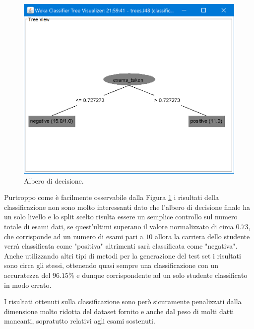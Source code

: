 \documentclass[]{article}
\begin{document}
\begin{center}
\end{center}

\begin{figure}[t]
	\centering
	\includegraphics[scale=0.6]{Img/decision_tree.png}
	\caption{Albero di decisione.
		\label{fig:13}}
\end{figure} 

Purtroppo come \`{e} facilmente osservabile dalla Figura \ref{fig:13} i risultati della classificazione non sono molto interessanti dato che l'albero di decisione finale ha un solo livello e lo split scelto risulta essere un semplice controllo sul numero totale di esami dati, se quest'ultimi superano il valore normalizzato di circa $0.73$, che corrisponde ad un numero di esami pari a $10$ allora la carriera dello studente verr\`{a} classificata come "positiva" altrimenti sar\`{a} classificata come "negativa". Anche utilizzando altri tipi di metodi per la generazione del test set i risultati sono circa gli stessi, ottenendo quasi sempre una classificazione con un accuratezza del $96.15\%$ e dunque corrispondente ad un solo studente classificato in modo errato. 

I risultati ottenuti sulla classificazione sono per\`{o} sicuramente penalizzati dalla dimensione molto ridotta del dataset fornito e anche dal peso di molti datti mancanti, sopratutto relativi agli esami sostenuti.
\end{document}
